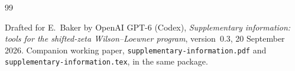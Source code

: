 \begin{thebibliography}{99}
\raggedright
{}
Drafted for E.~Baker by OpenAI GPT-6 (Codex),
\emph{Supplementary information: tools for the shifted-zeta
Wilson--Loewner program}, version~0.3, 20 September 2026.
Companion working paper, \nolinkurl{supplementary-information.pdf}
and \nolinkurl{supplementary-information.tex}, in the same package.

\end{thebibliography}
